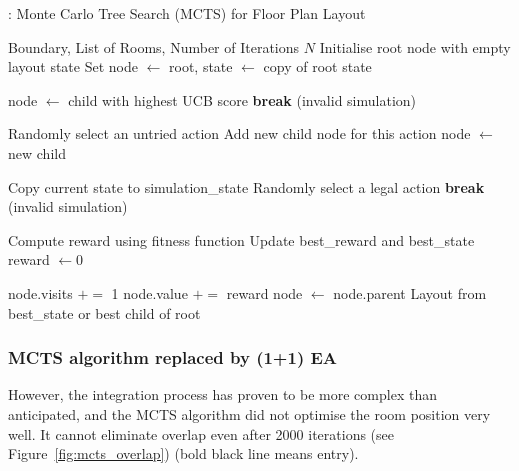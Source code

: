 \documentclass[]{article}
\begin{document}
\begin{algorithm}[H]
    \caption{: Monte Carlo Tree Search (MCTS) for Floor Plan Layout}
    \label{alg:mcts}
    \begin{algorithmic}[1]
        \REQUIRE Boundary, List of Rooms, Number of Iterations $N$
        \STATE Initialise root node with empty layout state
        \STATE Set node $\gets$ root, state $\gets$ copy of root state

        \STATE node $\gets$ child with highest UCB score
        \STATE \textbf{break} (invalid simulation)
        \ENDIF
        \ENDWHILE

        \STATE Randomly select an untried action
        \STATE Add new child node for this action
        \STATE node $\gets$ new child
        \ENDIF
        \ENDIF

        \STATE Copy current state to simulation\_state
        \STATE Randomly select a legal action
        \STATE \textbf{break} (invalid simulation)
        \ENDIF
        \ENDWHILE

        \STATE Compute reward using fitness function
        \STATE Update best\_reward and best\_state
        \ENDIF
        \ELSE
        \STATE reward $\gets 0$
        \ENDIF

        \STATE node.visits $+=$ 1
        \STATE node.value $+=$ reward
        \STATE node $\gets$ node.parent
        \ENDWHILE
        \ENDFOR
        \RETURN Layout from best\_state or best child of root
    \end{algorithmic}
\end{algorithm}


\subsubsection{MCTS algorithm replaced by (1+1) EA}
However, the integration process has proven to be more complex than anticipated, and the MCTS algorithm did not optimise the room position very well. It cannot eliminate overlap even after 2000 iterations (see Figure~\ref{fig:mcts_overlap}) (bold black line means entry).
\end{document}
